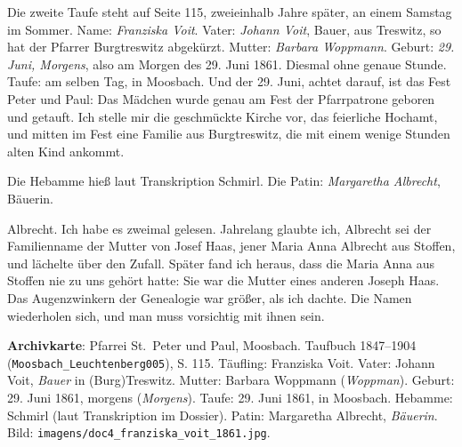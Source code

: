 \documentclass[
  ngerman,
  11pt,
  openany]{book}
\begin{document}
Die zweite Taufe steht auf Seite 115, zweieinhalb Jahre später, an einem
Samstag im Sommer. Name: \emph{Franziska Voit}. Vater: \emph{Johann
Voit}, Bauer, aus Treswitz, so hat der Pfarrer Burgtreswitz abgekürzt.
Mutter: \emph{Barbara Woppmann}. Geburt: \emph{29. Juni, Morgens}, also
am Morgen des 29. Juni 1861. Diesmal ohne genaue Stunde. Taufe: am
selben Tag, in Moosbach. Und der 29. Juni, achtet darauf, ist das Fest
Peter und Paul: Das Mädchen wurde genau am Fest der Pfarrpatrone geboren
und getauft. Ich stelle mir die geschmückte Kirche vor, das feierliche
Hochamt, und mitten im Fest eine Familie aus Burgtreswitz, die mit einem
wenige Stunden alten Kind ankommt.

Die Hebamme hieß laut Transkription Schmirl. Die Patin: \emph{Margaretha
Albrecht}, Bäuerin.

Albrecht. Ich habe es zweimal gelesen. Jahrelang glaubte ich, Albrecht
sei der Familienname der Mutter von Josef Haas, jener Maria Anna
Albrecht aus Stoffen, und lächelte über den Zufall. Später fand ich
heraus, dass die Maria Anna aus Stoffen nie zu uns gehört hatte: Sie war
die Mutter eines anderen Joseph Haas. Das Augenzwinkern der Genealogie
war größer, als ich dachte. Die Namen wiederholen sich, und man muss
vorsichtig mit ihnen sein.

\begin{ficha}

\textbf{Archivkarte}: Pfarrei St.~Peter und Paul, Moosbach. Taufbuch
1847--1904 (\texttt{Moosbach\_Leuchtenberg005}), S. 115. Täufling:
Franziska Voit. Vater: Johann Voit, \emph{Bauer} in (Burg)Treswitz.
Mutter: Barbara Woppmann (\emph{Woppman}). Geburt: 29. Juni 1861,
morgens (\emph{Morgens}). Taufe: 29. Juni 1861, in Moosbach. Hebamme:
Schmirl (laut Transkription im Dossier). Patin: Margaretha Albrecht,
\emph{Bäuerin}. Bild: \texttt{imagens/doc4\_franziska\_voit\_1861.jpg}.

\end{ficha}
\end{document}
